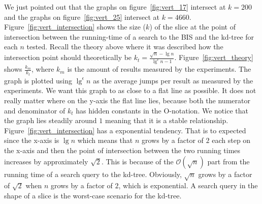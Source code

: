 We just pointed out that the graphs on figure~\ref{fig:vert_17} intersect at $k = 200$ and the graphs on  figure~\ref{fig:vert_25} intersect at $k = 4660$. Figure~\ref{fig:vert_intersection} shows the size ($k$) of the slice at the point of intersection between the running-time of a search to the BIS and the kd-tree for each $n$ tested. Recall the theory above where it was described how the intersection point should theoretically be $k_t = \frac{\sqrt{n} - \lg n}{\lg^\epsilon n - 1}$. Figure~\ref{fig:vert_theory} shows $\frac{k_m}{k_t}$, where $k_m$ is the amount of results measured by the experiments. The graph is plotted using $\lg^\epsilon n$ as the average jumps per result as measured by the experiments. We want this graph to as close to a flat line as possible. It does not really matter where on the y-axis the flat line lies, because both the numerator and denominator of $k_t$ has hidden constants in the O-notation. We notice that the graph lies steadily around $1$ meaning that it is a stable relationship. Figure~\ref{fig:vert_intersection} has a exponential tendency. That is to expected since the x-axis is $\lg n$ which means that $n$ grows by a factor of $2$ each step on the x-axis and then the point of intersection between the two running times increases by approximately $\sqrt{2}$. This is because of the $\mathcal{O}(\sqrt{n})$ part from the running time of a search query to the kd-tree. Obviously, $\sqrt{n}$ grows by a factor of $\sqrt{2}$ when $n$ grows by a factor of $2$, which is exponential. A search query in the shape of a slice is the worst-case scenario for the kd-tree.

